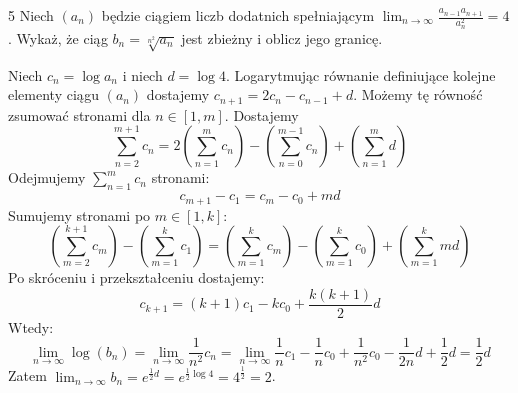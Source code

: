 \documentclass{../note}
\begin{document}
\begin{zadanie}{5}
Niech $(a_{n})$ będzie ciągiem liczb dodatnich spełniającym $ \lim_{n\rightarrow\infty}\frac{a_{n-1}a_{n+1}}{a_{n}^{2}}=4 $. Wykaż, że ciąg $ b_{n}=\sqrt[n^{2}]{a_{n}} $ jest zbieżny i oblicz jego granicę.
\end{zadanie}
\begin{rozwiazanie}
Niech $c_n = \log a_n$ i niech $d = \log 4$. Logarytmując równanie definiujące kolejne elementy ciągu $(a_n)$ dostajemy $c_{n+1} = 2c_n - c_{n-1} + d$. Możemy tę równość zsumować stronami dla $n \in [1, m]$. Dostajemy
\[\sum_{n=2}^{m+1} c_n = 2\left(\sum_{n=1}^{m} c_n\right) - \left(\sum_{n=0}^{m-1} c_n\right) + \left(\sum_{n=1}^{m} d\right)\]
Odejmujemy $\sum_{n=1}^{m} c_n$ stronami:
\[c_{m+1} - c_1 = c_m - c_0 + md\]
Sumujemy stronami po $m \in [1, k]$:
\[\left(\sum_{m=2}^{k+1} c_m\right) - \left(\sum_{m=1}^{k} c_1\right) = \left(\sum_{m=1}^{k} c_m\right) - \left(\sum_{m=1}^{k} c_0\right) + \left(\sum_{m=1}^{k} md\right)\]
Po skróceniu i przekształceniu dostajemy:
\[c_{k+1} = (k+1)c_1 - kc_0 + \frac{k(k+1)}{2} d\]
Wtedy:
\[\lim_{n\to\infty} \log(b_{n}) = \lim_{n\to\infty} \frac{1}{n^2} c_n = \lim_{n\to\infty} \frac1n c_1 - \frac1n c_0 + \frac{1}{n^2} c_0 - \frac{1}{2n}d + \frac12 d = \frac12 d\]
Zatem $\lim_{n\to\infty} b_{n} = e^{\frac12 d} = e^{\frac12 \log 4} = 4^{\frac12} = 2$.
\end{rozwiazanie}
\end{document}
